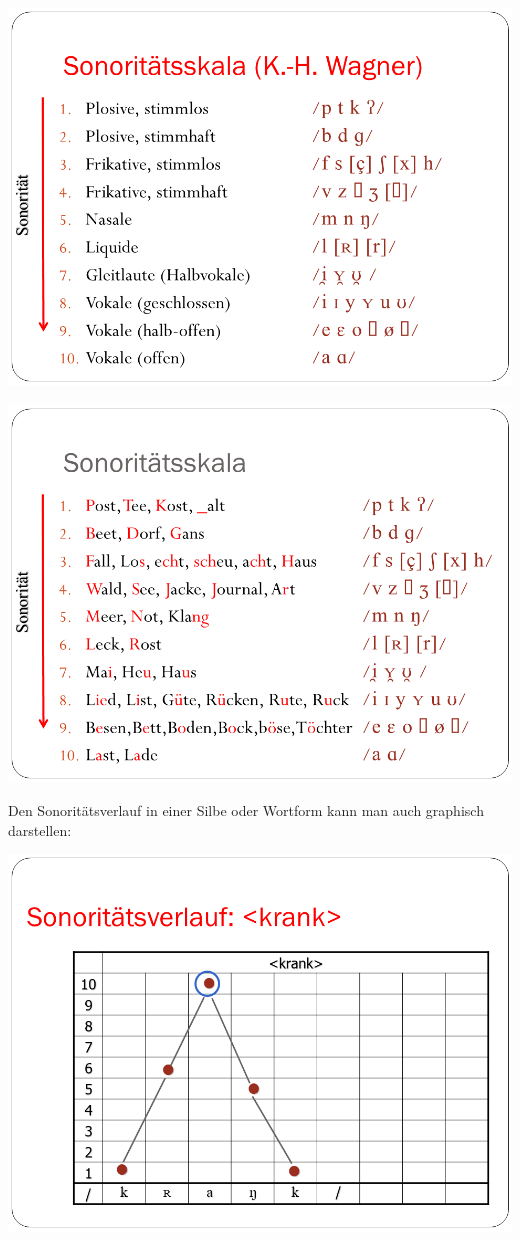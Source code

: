 \documentclass[
  letterpaper,
]{scrbook}
\begin{document}
\includegraphics[width=1\textwidth,height=\textheight]{./pictures/Wagner_Maas_Duden_Petric_9.PNG}

\includegraphics[width=1\textwidth,height=\textheight]{./pictures/Wagner_Maas_Duden_Petric_10.PNG}

Den Sonoritätsverlauf in einer Silbe oder Wortform kann man auch
graphisch darstellen:

\includegraphics[width=1\textwidth,height=\textheight]{./pictures/Wagner_Maas_Duden_Petric_11.PNG}
\end{document}
